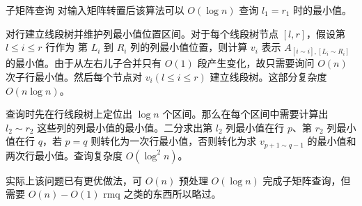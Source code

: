 \documentclass{beamer}
\begin{document}
\begin{frame}{子矩阵查询}
	对输入矩阵转置后该算法可以 $O(\log n)$ 查询 $l_1=r_1$ 时的最小值。
	
	对行建立线段树并维护列最小值位置区间。对于每个线段树节点 $[l,r]$，假设第 $l \leq i \leq r$ 行作为 第 $L_i$ 到 $R_i$ 列的列最小值位置，则计算 $v_i$ 表示 $A_{[i \sim i],[L_i \sim R_i]}$ 的最小值。由于从左右儿子合并只有 $O(1)$ 段产生变化，故只需要询问 $O(n)$ 次子行最小值。然后每个节点对 $v_i(l \leq i \leq r)$ 建立线段树。这部分复杂度 $O(n \log n)$。
	
	查询时先在行线段树上定位出 $\log n$ 个区间。那么在每个区间中需要计算出 $l_2 \sim r_2$ 这些列的列最小值的最小值。二分求出第 $l_2$ 列最小值在行 $p$、第 $r_2$ 列最小值在行 $q$，若 $p=q$ 则转化为一次行最小值，否则转化为求 $v_{p+1 \sim q-1}$ 的最小值和两次行最小值。查询复杂度 $O(\log^2 n)$。
	
	实际上该问题已有更优做法，可 $O(n)$ 预处理 $O(\log n)$ 完成子矩阵查询，但需要 $O(n)-O(1)$ rmq 之类的东西所以略过。
\end{frame}
\end{document}
